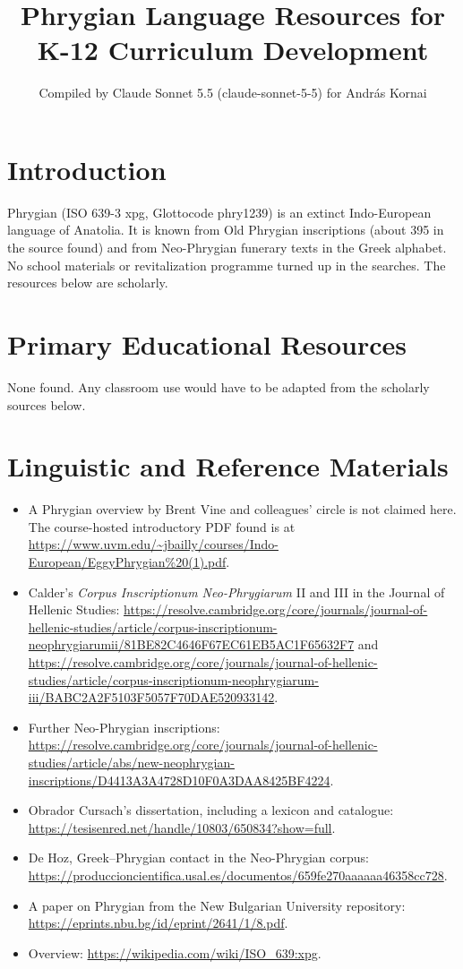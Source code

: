 \documentclass[12pt]{article}
\title{Phrygian Language Resources for K-12 Curriculum Development}
\author{Compiled by Claude Sonnet 5.5 (claude-sonnet-5-5) for Andr\'as Kornai}
\date{}
\begin{document}
\maketitle

\section{Introduction}
Phrygian (ISO 639-3 xpg, Glottocode phry1239) is an extinct Indo-European language of Anatolia. It is known from Old Phrygian inscriptions (about 395 in the source found) and from Neo-Phrygian funerary texts in the Greek alphabet. No school materials or revitalization programme turned up in the searches. The resources below are scholarly.

\section{Primary Educational Resources}
None found. Any classroom use would have to be adapted from the scholarly sources below.

\section{Linguistic and Reference Materials}
\begin{itemize}
\item A Phrygian overview by Brent Vine and colleagues' circle is not claimed here. The course-hosted introductory PDF found is at \url{https://www.uvm.edu/~jbailly/courses/Indo-European/EggyPhrygian%20(1).pdf}.
\item Calder's \emph{Corpus Inscriptionum Neo-Phrygiarum} II and III in the Journal of Hellenic Studies: \url{https://resolve.cambridge.org/core/journals/journal-of-hellenic-studies/article/corpus-inscriptionum-neophrygiarumii/81BE82C4646F67EC61EB5AC1F65632F7} and \url{https://resolve.cambridge.org/core/journals/journal-of-hellenic-studies/article/corpus-inscriptionum-neophrygiarum-iii/BABC2A2F5103F5057F70DAE520933142}.
\item Further Neo-Phrygian inscriptions: \url{https://resolve.cambridge.org/core/journals/journal-of-hellenic-studies/article/abs/new-neophrygian-inscriptions/D4413A3A4728D10F0A3DAA8425BF4224}.
\item Obrador Cursach's dissertation, including a lexicon and catalogue: \url{https://tesisenred.net/handle/10803/650834?show=full}.
\item De Hoz, Greek--Phrygian contact in the Neo-Phrygian corpus: \url{https://produccioncientifica.usal.es/documentos/659fe270aaaaaa46358cc728}.
\item A paper on Phrygian from the New Bulgarian University repository: \url{https://eprints.nbu.bg/id/eprint/2641/1/8.pdf}.
\item Overview: \url{https://wikipedia.com/wiki/ISO_639:xpg}.
\end{itemize}
\end{document}
